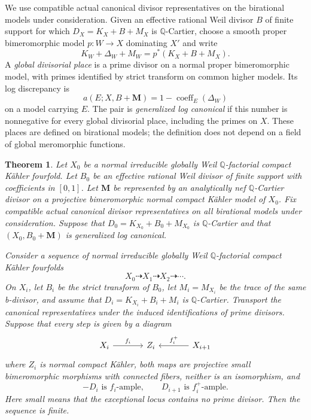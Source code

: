 \documentclass[11pt]{amsart}
\newtheorem{theorem}{Theorem}[section]
\theoremstyle{definition}
\theoremstyle{remark}
\numberwithin{equation}{section}
\newcommand{\Q}{\mathbb{Q}}
\newcommand{\M}{\mathbf{M}}
\begin{document}
We use compatible actual canonical divisor representatives on the birational models under consideration. Given an effective rational Weil divisor \(B\) of finite support for which \(D_X=K_X+B+M_X\) is \(\Q\)-Cartier, choose a smooth proper bimeromorphic model \(p:W\to X\) dominating \(X'\) and write
\begin{equation}\label{eq:discrepancy-definition}
 K_W+\Delta_W+M_W=p^*(K_X+B+M_X).
\end{equation}
A \emph{global divisorial place} is a prime divisor on a normal proper bimeromorphic model, with primes identified by strict transform on common higher models. Its log discrepancy is
\[
 a(E;X,B+\M)=1-\operatorname{coeff}_E(\Delta_W)
\]
on a model carrying \(E\). The pair is \emph{generalized log canonical} if this number is nonnegative for every global divisorial place, including the primes on \(X\). These places are defined on birational models; the definition does not depend on a field of global meromorphic functions.

\begin{theorem}\label{thm:main}
Let \(X_0\) be a normal irreducible globally Weil \(\Q\)-factorial compact K\"ahler fourfold. Let \(B_0\) be an effective rational Weil divisor of finite support with coefficients in \([0,1]\). Let \(\M\) be represented by an analytically nef \(\Q\)-Cartier divisor on a projective bimeromorphic normal compact K\"ahler model of \(X_0\). Fix compatible actual canonical divisor representatives on all birational models under consideration. Suppose that \(D_0=K_{X_0}+B_0+M_{X_0}\) is \(\Q\)-Cartier and that \((X_0,B_0+\M)\) is generalized log canonical.

Consider a sequence of normal irreducible globally Weil \(\Q\)-factorial compact K\"ahler fourfolds
\[
 X_0\dashrightarrow X_1\dashrightarrow X_2\dashrightarrow\cdots.
\]
On \(X_i\), let \(B_i\) be the strict transform of \(B_0\), let \(M_i=M_{X_i}\) be the trace of the same b-divisor, and assume that \(D_i=K_{X_i}+B_i+M_i\) is \(\Q\)-Cartier. Transport the canonical representatives under the induced identifications of prime divisors. Suppose that every step is given by a diagram
\begin{equation}\label{eq:flip-diagram}
\begin{tikzcd}[column sep=large]
 X_i \arrow[r,"f_i"] & Z_i & X_{i+1}\arrow[l,"f_i^+"']
\end{tikzcd}
\end{equation}
where \(Z_i\) is normal compact K\"ahler, both maps are projective small bimeromorphic morphisms with connected fibers, neither is an isomorphism, and
\[
 -D_i\text{ is }f_i\text{-ample},\qquad
 D_{i+1}\text{ is }f_i^+\text{-ample}.
\]
Here \emph{small} means that the exceptional locus contains no prime divisor. Then the sequence is finite.
\end{theorem}
\end{document}
